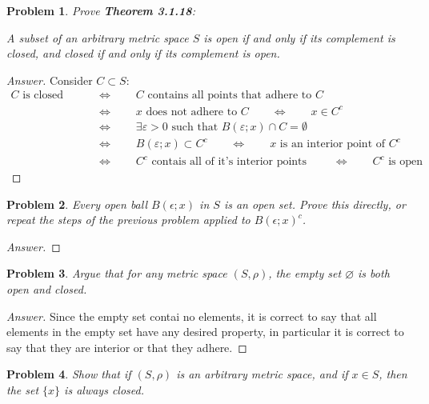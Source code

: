 \documentclass{article}
\newtheorem{problem}{Problem}
\newcommand{\qiffq}{\qquad \iff \qquad}
\begin{document}
\begin{problem}
    Prove \textbf{Theorem 3.1.18}:

    A subset of an arbitrary metric space $S$ is open if and only if its complement is closed, and closed if and only if its complement is open.
\end{problem}

\begin{proof}[Answer]
    Consider $C\subset S$:
    \begin{align*}
        C\text{ is closed } &\qiffq C \text{ contains all points that adhere to } C \\
        &\qiffq x \text{ does not adhere to } C\qiffq x \in C^c \\
        &\qiffq \exists \varepsilon>0 \text{ such that } B(\varepsilon; x) \cap C = \emptyset\\
        &\qiffq B(\varepsilon; x) \subset C^c \qiffq x \text{ is an interior point of } C^c\\
        &\qiffq C^c \text{ contais all of it's interior points } \qiffq C^c \text{ is open}
    \end{align*}
\end{proof}

\begin{problem}
    Every open ball $B(\epsilon ; x)$ in $S$ is an open set. Prove this directly, or repeat the steps of the previous problem applied to $B(\epsilon ; x)^{c}$.
\end{problem}

\begin{proof}[Answer]
    
\end{proof}

\begin{problem}
Argue that for any metric space $(S, \rho)$, the empty set $\varnothing$ is both open and closed.
\end{problem}

\begin{proof}[Answer]
    Since the empty set contai no elements, it is correct to say that all elements in the empty set have any desired property, in particular it is correct to say that they are interior or that they adhere.
\end{proof}

\begin{problem}
Show that if $(S, \rho)$ is an arbitrary metric space, and if $x \in S$, then the set $\{x\}$ is always closed.
\end{problem}
\end{document}
